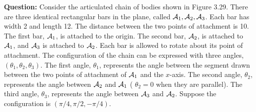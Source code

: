\documentclass[10pt,letterpaper]{article}
\begin{document}
\textbf{Question: } Consider the articulated chain of bodies shown in Figure 3.29. There are three identical rectangular bars in the plane, called  $ {\cal A}_1,{\cal A}_2,{\cal A}_3$. Each bar has width 2 and length 12. The distance between the two points of attachment is 10. The first bar,  $ {\cal A}_1$, is attached to the origin. The second bar,  $ {\cal A}_2$, is attached to  $ {\cal A}_1$, and  $ {\cal A}_3$ is attached to  $ {\cal A}_2$. Each bar is allowed to rotate about its point of attachment. The configuration of the chain can be expressed with three angles,  $ (\theta_1,\theta_2,\theta_3)$. The first angle, $ \theta_1$, represents the angle between the segment drawn between the two points of attachment of  $ {\cal A}_1$ and the $ x$-axis. The second angle, $ \theta_2$, represents the angle between  $ {\cal A}_2$ and  $ {\cal A}_1$ ( $ \theta_2
= 0$ when they are parallel). The third angle, $ \theta_3$, represents the angle between  $ {\cal A}_3$ and  $ {\cal A}_2$. Suppose the configuration is  $ (\pi/4,\pi/2,-\pi/4)$.
\end{document}
